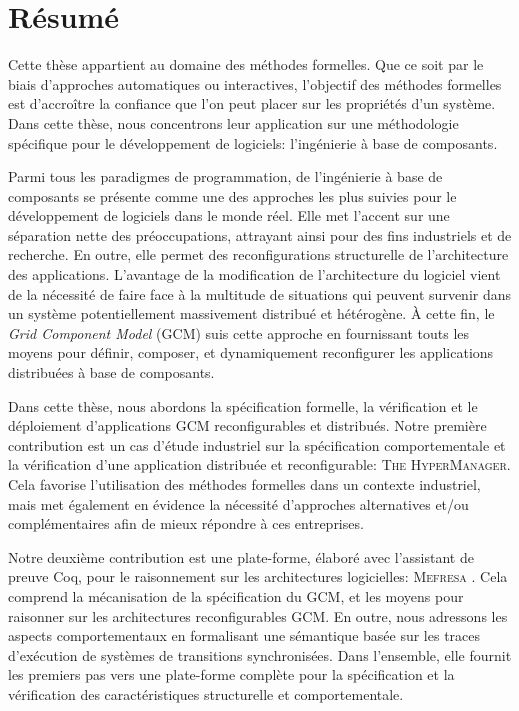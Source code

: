 


\chapter*{\centering R\'esum\'e}

Cette thèse appartient au domaine des méthodes formelles. 
Que ce soit par le biais d'approches automatiques ou interactives, l'objectif des méthodes formelles 
est d'accroître la confiance que l'on peut placer sur les propriétés d'un système. 
Dans cette thèse, nous concentrons 
leur application sur une méthodologie spécifique 
pour le développement de logiciels: l'ingénierie à base de composants. 


Parmi tous les paradigmes de programmation, de l'ingénierie à base de composants se présente comme une 
des approches les plus suivies pour le développement de logiciels dans le monde réel. Elle met l'accent 
sur une séparation nette des préoccupations, attrayant ainsi pour des fins industriels 
et de recherche. En outre, elle permet des reconfigurations structurelle 
de l'architecture des applications. L'avantage de la modification de l'architecture du logiciel 
vient de la nécessité de faire face à la multitude de situations 
qui peuvent survenir dans un système potentiellement massivement distribué et hétérogène. 
À cette fin, le \textit{Grid Component Model} (GCM) suis cette approche en fournissant touts  
les moyens pour définir, composer, et dynamiquement reconfigurer les applications distribuées 
à base de composants. 


Dans cette thèse, nous abordons la spécification formelle, la vérification et le déploiement
 d'applications GCM reconfigurables et distribués. Notre première contribution est un cas d'étude 
industriel 
 sur la spécification comportementale et la vérification d'une application distribuée et 
 reconfigurable: \textsc{The HyperManager}. 
Cela favorise l'utilisation des méthodes formelles dans un contexte industriel, 
     mais met également en évidence la nécessité d'approches alternatives et/ou complémentaires 
afin de mieux répondre à ces entreprises. 

Notre deuxième contribution est une plate-forme, élaboré avec l'assistant de preuve Coq, 
pour le raisonnement sur ​​les architectures logicielles: \textsc {Mefresa} . Cela comprend 
la mécanisation de la spécification du GCM, et les moyens pour 
raisonner sur les architectures reconfigurables GCM. En outre, nous adressons 
les aspects comportementaux en formalisant une sémantique basée sur les traces d'exécution de 
systèmes de transitions synchronisées. 
Dans l'ensemble, elle fournit les premiers pas vers une plate-forme complète pour la spécification 
et la vérification des caractéristiques structurelle et comportementale. 

